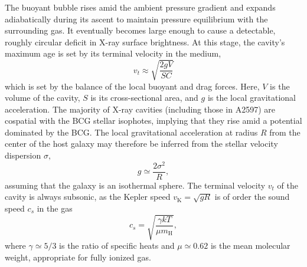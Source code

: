 

The buoyant bubble rises amid the ambient pressure gradient and expands adiabatically during 
its ascent to maintain pressure equilibrium with the surrounding gas. It eventually becomes 
large enough to cause a detectable, roughly circular deficit in X-ray surface brightness.  
At this stage, the cavity's 
maximum age is set by its terminal velocity in the medium, 
\begin{equation}
v_t \approx \sqrt{\frac{2gV}{SC}}
\end{equation}
which is set by the balance of the local buoyant and drag forces. Here, $V$ is the volume of the cavity, $S$ is its cross-sectional area, 
and $g$ is the local gravitational acceleration. The majority of X-ray cavities (including those in A2597) are cospatial with the BCG stellar isophotes, implying 
that they rise amid a potential dominated by the BCG. The local gravitational acceleration at radius $R$ from the center of the host galaxy may therefore be inferred from the stellar 
velocity dispersion $\sigma,
$\begin{equation}
g \simeq \frac{2\sigma^2}{R},
\end{equation}
assuming that the galaxy is an isothermal sphere. 
The terminal velocity $v_t$ of the cavity is always subsonic, as the Kepler speed $v_\mathrm{K} = \sqrt{gR}$ is of order the 
sound speed $c_s$ in the gas 
\begin{equation}
c_s=\sqrt{\frac{\gamma kT}{\mu m_\mathrm{H}}}, 
\end{equation}
where $\gamma\simeq5/3$ is the ratio of specific heats and $\mu\simeq0.62$ is the mean molecular weight, appropriate for fully ionized gas.   


